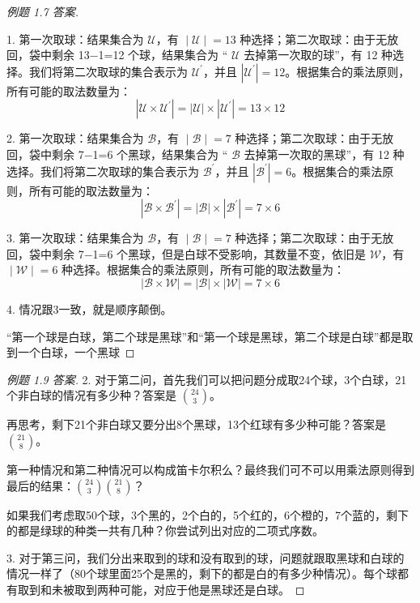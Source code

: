 \documentclass[lang=cn,math=mtpro2,11pt,scheme=chinese,pad]{elegantbook}
\begin{document}
\begin{proof}[例题 1.7 答案]
\begin{itemize}
  1. 第一次取球：结果集合为 \(\mathcal{U}\)，有 \(∣\mathcal{U}∣=13\) 种选择；第二次取球：由于无放回，袋中剩余 13−1=12 个球，结果集合为 “ \(\mathcal{U}\) 去掉第一次取的球”，有 12 种选择。我们将第二次取球的集合表示为 \(\mathcal{U}^{\prime}\)，并且 \(|\mathcal{U}^{\prime}| = 12\)。根据集合的乘法原则，所有可能的取法数量为：
  \[
  |\mathcal{U} \times \mathcal{U}^{\prime}| = |\mathcal{U}| \times |\mathcal{U}^{\prime}| = 13 \times 12
  \]

  2. 第一次取球：结果集合为 \(\mathcal{B}\)，有 \(∣\mathcal{B}∣=7\) 种选择；第二次取球：由于无放回，袋中剩余 7−1=6 个黑球，结果集合为 “ \(\mathcal{B}\) 去掉第一次取的黑球”，有 12 种选择。我们将第二次取球的集合表示为 \(\mathcal{B}^{\prime}\)，并且 \(|\mathcal{B}^{\prime}| = 6\)。根据集合的乘法原则，所有可能的取法数量为：
  \[
  |\mathcal{B} \times \mathcal{B}^{\prime}| = |\mathcal{B}| \times |\mathcal{B}^{\prime}| = 7 \times 6
  \]

  3. 第一次取球：结果集合为 \(\mathcal{B}\)，有 \(∣\mathcal{B}∣=7\) 种选择；第二次取球：由于无放回，袋中剩余 7−1=6 个黑球，但是白球不受影响，其数量不变，依旧是 \(\mathcal{W}\)，有 \(∣\mathcal{W}∣=6\) 种选择。根据集合的乘法原则，所有可能的取法数量为：
  \[
  |\mathcal{B} \times \mathcal{W}| = |\mathcal{B}| \times |\mathcal{W}| = 7 \times 6
  \]

  4. 情况跟3一致，就是顺序颠倒。
  \end{itemize}

  “第一个球是白球，第二个球是黑球”和“第一个球是黑球，第二个球是白球”都是取到一个白球，一个黑球
\end{proof}

\begin{proof}[例题 1.9 答案]
  2. 对于第二问，首先我们可以把问题分成取24个球，3个白球，21个非白球的情况有多少种？答案是 \(\binom{24}{3}\)。

  再思考，剩下21个非白球又要分出8个黑球，13个红球有多少种可能？答案是 \(\binom{21}{8}\)。

  第一种情况和第二种情况可以构成笛卡尔积么？最终我们可不可以用乘法原则得到最后的结果：\(\binom{24}{3}\binom{21}{8}\)？

  如果我们考虑取50个球，3个黑的，2个白的，5个红的，6个橙的，7个蓝的，剩下的都是绿球的种类一共有几种？你尝试列出对应的二项式序数。

  3. 对于第三问，我们分出来取到的球和没有取到的球，问题就跟取黑球和白球的情况一样了（80个球里面25个是黑的，剩下的都是白的有多少种情况）。每个球都有取到和未被取到两种可能，对应于他是黑球还是白球。
\end{proof}
\end{document}
